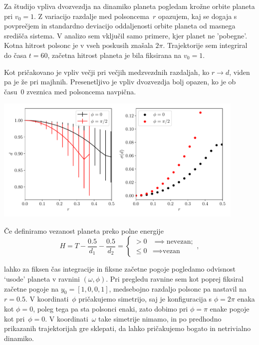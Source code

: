 Za študijo vpliva dvozvezdja na dinamiko planeta pogledam krožne orbite planeta
pri $v_0 = 1$. Z variacijo razdalje med polsoncema~$r$ opazujem, kaj se dogaja s
povprečjem in standardno deviacijo oddaljenosti  orbite planeta od masnega
središča sistema. V analizo sem vključil samo primere, kjer planet ne 'pobegne'.
Kotna hitrost polsonc je v vseh poskusih znašala $2\pi$. Trajektorije sem
integriral do časa $t=60$, začetna hitrost planeta je bila fiksirana na $v_0=1$.

Kot pričakovano je vpliv večji pri večjih medzvezdnih razdaljah, ko $r
    \rightarrow d$, viden pa je že pri majhnih. Presenetljivo je vpliv
dvozvezdja bolj opazen, ko je ob času~0 zveznica med polsoncema navpična.

\begin{center}
    \includegraphics[width=0.9\textwidth]{../images/2-2-vplivr.pdf}
\end{center}

Če definiramo vezanost planeta preko polne energije
\[
    H = T - \frac{0.5}{d_1} - \frac{0.5}{d_2} = \begin{cases}
        > 0    & \implies \text{nevezan}; \\
        \leq 0 & \implies \text{vezan}
    \end{cases},
\]

lahko za fiksen čas integracije in fiksne začetne pogoje pogledamo odvisnost
`usode' planeta v ravnini $(\omega, \phi)$. Pri pregledu ravnine sem kot poprej
fiksiral začetne pogoje  na  $y_0 = \left[ 1,0,0,1\right]$,  medsebojno razdaljo
polsonc pa nastavil na $r=0.5$. V koordinati~$\phi$ pričakujemo simetrijo, saj
je konfiguracija s $\phi = 2\pi$ enaka kot $\phi=0$, poleg tega pa sta polsonci
enaki, zato dobimo pri $\phi=\pi$ enake pogoje kot pri~$\phi=0$. V
koordinati~$\omega$ take simetrije nimamo, in po predhodno prikazanih trajektorijah
gre sklepati, da lahko pričakujemo bogato in netrivialno dinamiko.

